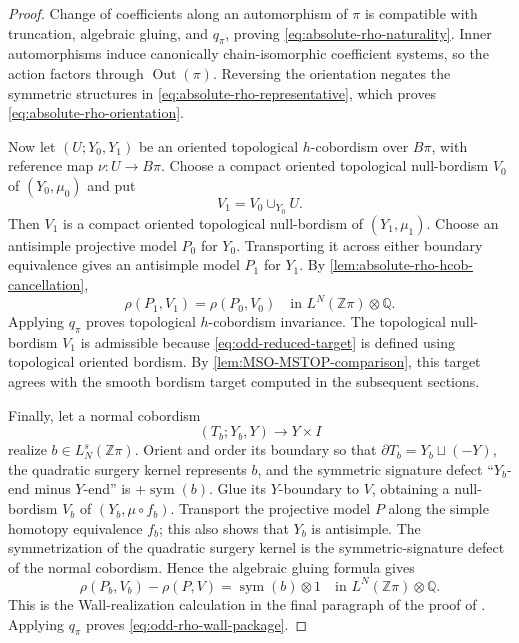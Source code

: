 \documentclass[10pt,reqno]{amsart}
\numberwithin{equation}{section}
\theoremstyle{definition}
\theoremstyle{remark}
\newcommand{\Z}{\mathbb Z}
\newcommand{\Q}{\mathbb Q}
\newcommand{\Out}{\operatorname{Out}}
\begin{document}
\begin{proof}
Change of coefficients along an automorphism of \(\pi\) is compatible
with truncation, algebraic gluing, and \(q_\pi\), proving
\eqref{eq:absolute-rho-naturality}.  Inner automorphisms induce
canonically chain-isomorphic coefficient systems, so the action
factors through \(\Out(\pi)\).  Reversing the orientation negates the
symmetric structures in \eqref{eq:absolute-rho-representative}, which
proves \eqref{eq:absolute-rho-orientation}.

Now let \((U;Y_0,Y_1)\) be an oriented topological \(h\)-cobordism
over \(B\pi\), with reference map \(\nu:U\to B\pi\).  Choose a
compact oriented topological null-bordism \(V_0\) of \((Y_0,\mu_0)\)
and put
\[
V_1=V_0\cup_{Y_0}U.
\]
Then \(V_1\) is a compact oriented topological null-bordism of
\((Y_1,\mu_1)\).  Choose an antisimple projective model \(P_0\) for
\(Y_0\).  Transporting it across either boundary equivalence gives an
antisimple model \(P_1\) for \(Y_1\).  By
\cref{lem:absolute-rho-hcob-cancellation},
\[
\rho(P_1,V_1)=\rho(P_0,V_0)
\quad\text{in }L^N(\Z\pi)\otimes\Q.
\]
Applying \(q_\pi\) proves topological \(h\)-cobordism invariance.
The topological null-bordism \(V_1\) is admissible because
\eqref{eq:odd-reduced-target} is defined using topological oriented
bordism.  By
\cref{lem:MSO-MSTOP-comparison}, this target agrees with the smooth
bordism target computed in the subsequent sections.

Finally, let a normal cobordism
\[
(T_b;Y_b,Y)\longrightarrow Y\times I
\]
realize \(b\in L_N^s(\Z\pi)\).  Orient and order its boundary so that
 \(\partial T_b=Y_b\sqcup(-Y)\), the quadratic surgery kernel
represents \(b\), and the symmetric signature defect
``\(Y_b\)-end minus \(Y\)-end'' is \(+\operatorname{sym}(b)\).
Glue its \(Y\)-boundary to \(V\), obtaining a null-bordism \(V_b\) of
\((Y_b,\mu\circ f_b)\).  Transport the projective model \(P\) along
the simple homotopy equivalence \(f_b\); this also shows that \(Y_b\)
is antisimple.  The symmetrization of the quadratic surgery kernel is
the symmetric-signature defect of the normal cobordism.  Hence the
algebraic gluing formula gives
\begin{equation}\label{eq:absolute-rho-wall-upstairs}
\rho(P_b,V_b)-\rho(P,V)
=
\operatorname{sym}(b)\otimes1
\quad\text{in }L^N(\Z\pi)\otimes\Q.
\end{equation}
This is the Wall-realization calculation in the final paragraph of
the proof of \cite[Proposition~2.26]{DFW}.  Applying \(q_\pi\) proves
\eqref{eq:odd-rho-wall-package}.
\end{proof}
\end{document}
